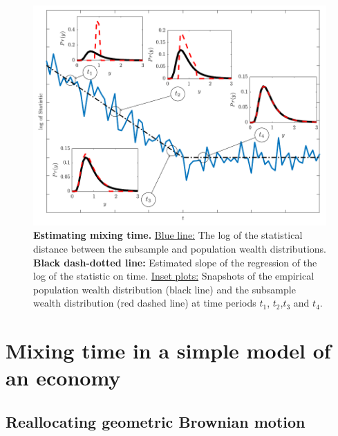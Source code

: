 \documentclass[11pt]{article}
\numberwithin{equation}{section}
\begin{document}
\begin{figure}[!htb]
\centering
\includegraphics[width=1.0\textwidth]{figs/fig_mixing_time.pdf}
\caption{\textbf{Estimating mixing time.} \underline{Blue line:} The log of the statistical distance between the subsample and population wealth distributions. \textbf{Black dash-dotted line:} Estimated slope of the regression of the log of the statistic on time. \underline{Inset plots:} Snapshots of the empirical population wealth distribution (black line) and the subsample wealth distribution (red dashed line) at time periods $t_1$, $t_2$,$t_3$ and $t_4$.  \label{fig:mixing-time}}
\end{figure}

\FloatBarrier
\section{Mixing time in a simple model of an economy}\label{sec:rgbm}
\subsection{Reallocating geometric Brownian motion}
\end{document}

